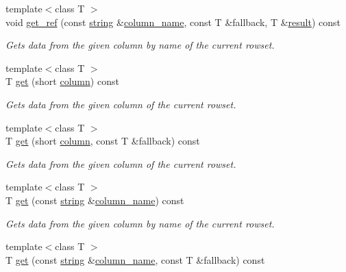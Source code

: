\begin{DoxyCompactItemize}
{\footnotesize template$<$class T $>$ }\\void \mbox{\hyperlink{classnanodbc_1_1result_aacbd54c96647e3450c62b16a0678d027}{get\+\_\+ref}} (const \mbox{\hyperlink{namespacenanodbc_abfc0ece56278e590911ec8352774c212}{string}} \&\mbox{\hyperlink{classnanodbc_1_1result_a2bd3fc4e416108960c4191b2cbba256b}{column\+\_\+name}}, const T \&fallback, T \&\mbox{\hyperlink{classnanodbc_1_1result}{result}}) const
\begin{DoxyCompactList}\small\item\em Gets data from the given column by name of the current rowset. \end{DoxyCompactList}\item 
{\footnotesize template$<$class T $>$ }\\T \mbox{\hyperlink{classnanodbc_1_1result_affa949e32147a8f262d066a790651ad7}{get}} (short \mbox{\hyperlink{classnanodbc_1_1result_ae4e254b2db63c65473cc058de3d5a844}{column}}) const
\begin{DoxyCompactList}\small\item\em Gets data from the given column of the current rowset. \end{DoxyCompactList}\item 
{\footnotesize template$<$class T $>$ }\\T \mbox{\hyperlink{classnanodbc_1_1result_af33ef788292fc12198c06924db24fe97}{get}} (short \mbox{\hyperlink{classnanodbc_1_1result_ae4e254b2db63c65473cc058de3d5a844}{column}}, const T \&fallback) const
\begin{DoxyCompactList}\small\item\em Gets data from the given column of the current rowset. \end{DoxyCompactList}\item 
{\footnotesize template$<$class T $>$ }\\T \mbox{\hyperlink{classnanodbc_1_1result_a3be6ab61aea0902cb05f55ad814e85c1}{get}} (const \mbox{\hyperlink{namespacenanodbc_abfc0ece56278e590911ec8352774c212}{string}} \&\mbox{\hyperlink{classnanodbc_1_1result_a2bd3fc4e416108960c4191b2cbba256b}{column\+\_\+name}}) const
\begin{DoxyCompactList}\small\item\em Gets data from the given column by name of the current rowset. \end{DoxyCompactList}\item 
{\footnotesize template$<$class T $>$ }\\T \mbox{\hyperlink{classnanodbc_1_1result_a447e4575031945386b584c576c3a89bd}{get}} (const \mbox{\hyperlink{namespacenanodbc_abfc0ece56278e590911ec8352774c212}{string}} \&\mbox{\hyperlink{classnanodbc_1_1result_a2bd3fc4e416108960c4191b2cbba256b}{column\+\_\+name}}, const T \&fallback) const

\end{DoxyCompactItemize}
